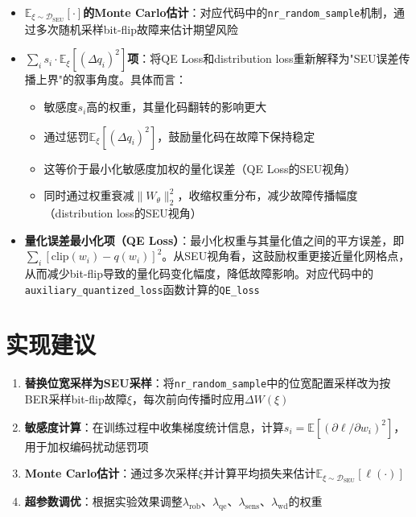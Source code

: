 \documentclass[12pt]{article}
\begin{document}
\begin{itemize}
    \item \textbf{$\mathbb{E}_{\xi\sim\mathcal{D}_{\text{SEU}}}[\cdot]$的Monte Carlo估计}：对应代码中的\texttt{nr\_random\_sample}机制，通过多次随机采样bit-flip故障来估计期望风险
    
    \item \textbf{$\sum_i s_i\cdot \mathbb{E}_{\xi}[(\Delta q_i)^2]$项}：将QE Loss和distribution loss重新解释为"SEU误差传播上界"的叙事角度。具体而言：
    \begin{itemize}
        \item 敏感度$s_i$高的权重，其量化码翻转的影响更大
        \item 通过惩罚$\mathbb{E}_{\xi}[(\Delta q_i)^2]$，鼓励量化码在故障下保持稳定
        \item 这等价于最小化敏感度加权的量化误差（QE Loss的SEU视角）
        \item 同时通过权重衰减$\|W_\theta\|_2^2$，收缩权重分布，减少故障传播幅度（distribution loss的SEU视角）
    \end{itemize}
    
    \item \textbf{量化误差最小化项（QE Loss）}：最小化权重与其量化值之间的平方误差，即$\sum_i[\mathrm{clip}(w_i) - q(w_i)]^2$。从SEU视角看，这鼓励权重更接近量化网格点，从而减少bit-flip导致的量化码变化幅度，降低故障影响。对应代码中的\texttt{auxiliary\_quantized\_loss}函数计算的\texttt{QE\_loss}
\end{itemize}

\section{实现建议}

\begin{enumerate}
    \item \textbf{替换位宽采样为SEU采样}：将\texttt{nr\_random\_sample}中的位宽配置采样改为按BER采样bit-flip故障$\xi$，每次前向传播时应用$\Delta W(\xi)$
    
    \item \textbf{敏感度计算}：在训练过程中收集梯度统计信息，计算$s_i=\mathbb{E}[(\partial \ell/\partial w_i)^2]$，用于加权编码扰动惩罚项
    
    \item \textbf{Monte Carlo估计}：通过多次采样$\xi$并计算平均损失来估计$\mathbb{E}_{\xi\sim\mathcal{D}_{\text{SEU}}}[\ell(\cdot)]$
    
    \item \textbf{超参数调优}：根据实验效果调整$\lambda_{\text{rob}}$、$\lambda_{\text{qe}}$、$\lambda_{\text{sens}}$、$\lambda_{\text{wd}}$的权重
\end{enumerate}
\end{document}
